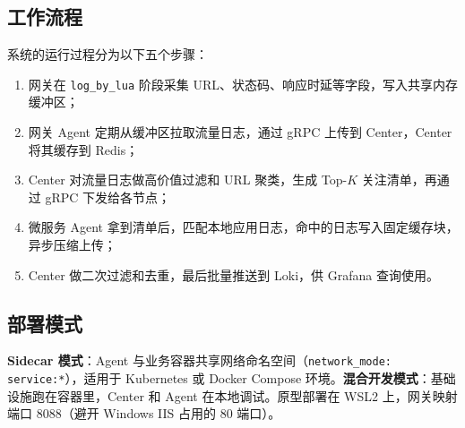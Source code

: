 \subsection{工作流程}
系统的运行过程分为以下五个步骤：
\begin{enumerate}
  \item 网关在 \texttt{log\_by\_lua} 阶段采集 URL、状态码、响应时延等字段，写入共享内存缓冲区；
  \item 网关 Agent 定期从缓冲区拉取流量日志，通过 gRPC 上传到 Center，Center 将其缓存到 Redis；
  \item Center 对流量日志做高价值过滤和 URL 聚类，生成 Top-$K$ 关注清单，再通过 gRPC 下发给各节点；
  \item 微服务 Agent 拿到清单后，匹配本地应用日志，命中的日志写入固定缓存块，异步压缩上传；
  \item Center 做二次过滤和去重，最后批量推送到 Loki，供 Grafana 查询使用。
\end{enumerate}

\subsection{部署模式}
\textbf{Sidecar 模式}：Agent 与业务容器共享网络命名空间（\texttt{network\_mode: service:*}），适用于 Kubernetes 或 Docker Compose 环境。\textbf{混合开发模式}：基础设施跑在容器里，Center 和 Agent 在本地调试。原型部署在 WSL2 上，网关映射端口 8088（避开 Windows IIS 占用的 80 端口）。
